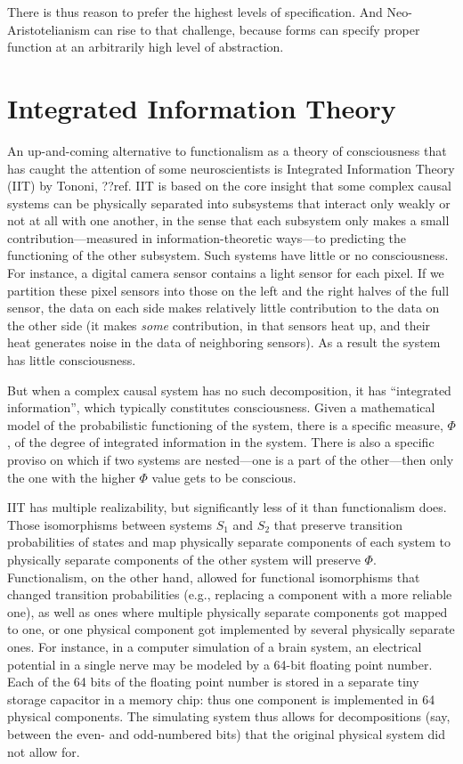 There is thus reason to prefer the highest levels of specification. And Neo-Aristotelianism can rise to that challenge, because 
forms can specify proper function at an arbitrarily high level of abstraction. 

\section{Integrated Information Theory}
An up-and-coming alternative to functionalism as a theory of consciousness that has caught the attention of some 
neuroscientists is Integrated Information Theory (IIT) by Tononi, ??ref. IIT is based on the core insight that some complex causal systems 
can be physically separated into subsystems that interact only weakly or not at all with one another, in the sense that each 
subsystem only makes a small contribution---measured in information-theoretic ways---to predicting the functioning 
of the other subsystem. Such systems have little or no consciousness. For instance, a digital camera sensor contains a 
light sensor for each pixel. If we partition these pixel sensors into those on the left and the right halves of the 
full sensor, the data on each side makes relatively little contribution to the data on the other side (it makes \textit{some}
contribution, in that sensors heat up, and their heat generates noise in the data of neighboring
sensors). As a result the system has little consciousness.

But when a complex causal system has no such decomposition, it has ``integrated information'',
which typically constitutes consciousness. Given a mathematical model of the probabilistic functioning of the system, 
there is a specific measure, $\Phi$, of the degree of integrated information in the system. There is also a specific
proviso on which if two systems are nested---one is a part of the other---then only the one with the higher $\Phi$
value gets to be conscious. 

IIT has multiple realizability, but significantly less of it than functionalism does. Those isomorphisms 
between systems $S_1$ and $S_2$ that preserve transition probabilities of states and map physically separate 
components of each system to physically separate components of the other system will preserve $\Phi$. 
Functionalism, on the other hand, allowed for functional isomorphisms that changed transition probabilities 
(e.g., replacing a component with a more reliable one), as well as ones where multiple physically separate 
components got mapped to one, or one physical component got implemented by several physically separate ones. 
For instance, in a computer simulation of a brain system, an electrical potential in a single nerve may be 
modeled by a 64-bit floating point number. Each of the 64 bits of the floating point number is stored in a
separate tiny storage capacitor in a memory chip: thus one component is implemented in 64 physical components.
The simulating system thus allows for decompositions (say, between the even- and odd-numbered bits) that the original
physical system did not allow for. 

